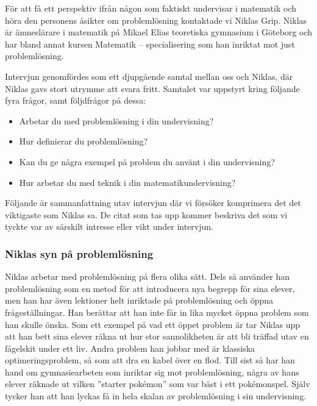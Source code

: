\textcolor{turkos}{
För att få ett perspektiv ifrån någon som faktiskt undervisar i matematik och höra den personens åsikter om problemlösning kontaktade vi Niklas Grip. Niklas är ämneslärare i matematik på Mikael Elias teoretiska gymnasium i Göteborg och har bland annat kursen Matematik – specialisering som han inriktat mot just problemlösning.
}

\textcolor{turkos}{
Intervjun genomfördes som ett djupgående samtal mellan oss och Niklas, där Niklas gavs stort utrymme att svara fritt. Samtalet var uppstyrt kring följande fyra frågor, samt följdfrågor på dessa: 
}
\begin{itemize}
  \item \textcolor{turkos}{Arbetar du med problemlösning i din undervisning?}
  \item \textcolor{turkos}{Hur definierar du problemlösning?}
  \item \textcolor{turkos}{Kan du ge några exempel på problem du använt i din undervisning?}
  \item \textcolor{turkos}{Hur arbetar du med teknik i din matematikundervisning?}
\end{itemize}

\noindent \textcolor{turkos}{
Följande är sammanfattning utav intervjun där vi försöker komprimera det det viktigaste som Niklas sa. De citat som tas upp kommer beskriva det som vi tyckte var av särskilt intresse eller vikt under intervjun. 
}

\subsubsection{Niklas syn på problemlösning}
\label{sec:Niklassyn}

\textcolor{turkos}{
Niklas arbetar med problemlösning på flera olika sätt. Dels så använder han problemlösning som en metod för att introducera nya begrepp för sina elever, men han har även lektioner helt inriktade på problemlösning och öppna frågeställningar. Han berättar att han inte får in lika mycket öppna problem som han skulle önska. Som ett exempel på vad ett öppet problem är tar Niklas upp att han bett sina elever räkna ut hur stor sannolikheten är att bli träffad utav en fågelskit under ett liv. Andra problem han jobbar med är klassiska optimeringsproblem, så som att dra en kabel över en flod. Till sist så har han hand om gymnasiearbeten som inriktar sig mot problemlösning, några av hans elever räknade ut vilken ''starter pokémon'' som var bäst i ett pokémonspel. Själv tycker han att han lyckas få in hela skalan av problemlösning i sin undervisning.
}

